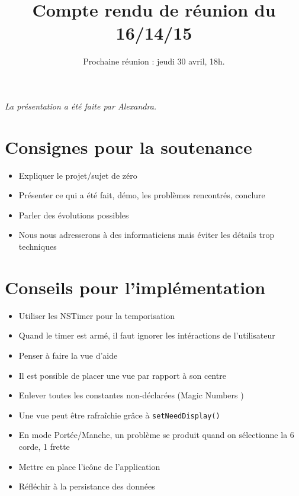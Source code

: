 \documentclass{scrartcl}
\begin{document}

\title{Compte rendu de réunion du 16/14/15}
\subtitle{Prochaine réunion : jeudi 30 avril, 18h.\vspace{-5ex}}
\date{}
\maketitle

\textit{La présentation a été faite par Alexandra.}

\section{Consignes pour la soutenance}
\begin{itemize}
	\item Expliquer le projet/sujet de zéro
	\item Présenter ce qui a été fait, démo,  les problèmes rencontrés, conclure
	\item Parler des évolutions possibles
	\item Nous nous adresserons à des informaticiens mais éviter les détails trop techniques
\end{itemize}

\section{Conseils pour l'implémentation}
\begin{itemize}
	\item Utiliser les NSTimer pour la temporisation
	\item Quand le timer est armé, il faut ignorer les intéractions de l'utilisateur
	\item Penser à faire la vue d'aide
	\item Il est possible de placer une vue par rapport à son centre
	\item Enlever toutes les constantes non-déclarées (\og Magic Numbers \fg{})
	\item Une vue peut être rafraîchie grâce à \texttt{setNeedDisplay()}
	\item En mode Portée/Manche, un problème se produit quand on sélectionne la 6 corde, 1 frette
	\item Mettre en place l'icône de l'application
	\item Réfléchir à la persistance des données
\end{itemize}
\end{document}
